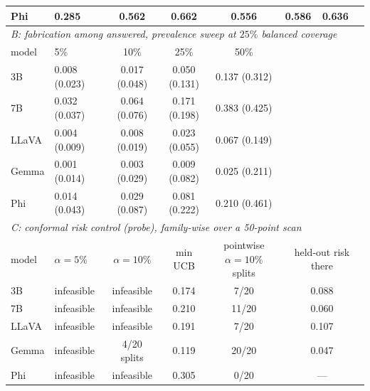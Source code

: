 \documentclass[10pt]{article}
\begin{document}
\begin{table}[t]
\begin{tabular}{llcccccc}
Phi & \textbf{0.285} & 0.562 & 0.662 & \textbf{0.556} & 0.586 & 0.636 & \\
\midrule
\multicolumn{8}{l}{\emph{B: fabrication among answered, prevalence sweep at $25\%$ balanced coverage}}\\
model & 5\% & 10\% & 25\% & 50\% & & & \\
\midrule
3B & 0.008 (0.023) & 0.017 (0.048) & 0.050 (0.131) & 0.137 (0.312) & & & \\
7B & 0.032 (0.037) & 0.064 (0.076) & 0.171 (0.198) & 0.383 (0.425) & & & \\
LLaVA & 0.004 (0.009) & 0.008 (0.019) & 0.023 (0.055) & 0.067 (0.149) & & & \\
Gemma & 0.001 (0.014) & 0.003 (0.029) & 0.009 (0.082) & 0.025 (0.211) & & & \\
Phi & 0.014 (0.043) & 0.029 (0.087) & 0.081 (0.222) & 0.210 (0.461) & & & \\
\midrule
\multicolumn{8}{l}{\emph{C: conformal risk control (probe), family-wise over a 50-point scan}}\\
model & $\alpha=5\%$ & $\alpha=10\%$ & min UCB & pointwise $\alpha=10\%$ splits & \multicolumn{3}{c}{held-out risk there} \\
\midrule
3B & infeasible & infeasible & 0.174 & 7/20 & \multicolumn{3}{c}{0.088} \\
7B & infeasible & infeasible & 0.210 & 11/20 & \multicolumn{3}{c}{0.060} \\
LLaVA & infeasible & infeasible & 0.191 & 7/20 & \multicolumn{3}{c}{0.107} \\
Gemma & infeasible & 4/20 splits & 0.119 & 20/20 & \multicolumn{3}{c}{0.047} \\
Phi & infeasible & infeasible & 0.305 & 0/20 & \multicolumn{3}{c}{---} \\
\bottomrule
\end{tabular}
\end{table}
\end{document}
